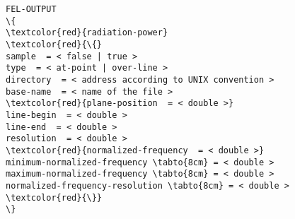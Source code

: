 \documentclass[a4paper]{article}
\begin{document}
\begin{Verbatim}[fontsize=\footnotesize, tabsize=2, fontfamily=courier,	fontseries=b, commandchars=\\\{\}]
FEL-OUTPUT
\{
\textcolor{red}{radiation-power}
\textcolor{red}{\{}
sample  = < false | true >
type  = < at-point | over-line >
directory  = < address according to UNIX convention >
base-name  = < name of the file >
\textcolor{red}{plane-position  = < double >}
line-begin  = < double >
line-end  = < double >
resolution  = < double >
\textcolor{red}{normalized-frequency  = < double >}
minimum-normalized-frequency \tabto{8cm} = < double >
maximum-normalized-frequency \tabto{8cm} = < double >
normalized-frequency-resolution \tabto{8cm} = < double >
\textcolor{red}{\}}
\}
\end{Verbatim}
\end{document}
